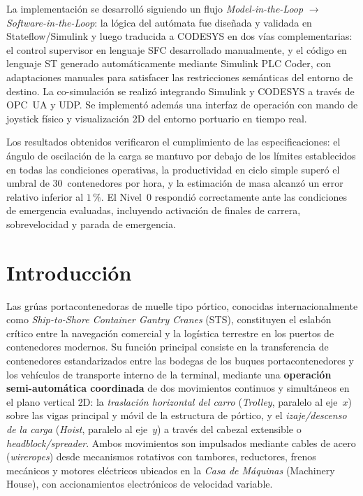 \documentclass[12pt, a4paper]{article}
\begin{document}
La implementación se desarrolló siguiendo un flujo \textit{Model-in-the-Loop}
$\rightarrow$ \textit{Software-in-the-Loop}: la lógica del autómata fue diseñada y
validada en Stateflow/Simulink y luego traducida a CODESYS en dos vías complementarias:
el control supervisor en lenguaje SFC desarrollado manualmente, y el código en lenguaje
ST generado automáticamente mediante Simulink PLC Coder, con adaptaciones manuales para
satisfacer las restricciones semánticas del entorno de destino. La co-simulación se
realizó integrando Simulink y CODESYS a través de OPC~UA y UDP\@. Se implementó además
una interfaz de operación con mando de joystick físico y visualización 2D del entorno
portuario en tiempo real.

Los resultados obtenidos verificaron el cumplimiento de las especificaciones: el
ángulo de oscilación de la carga se mantuvo por debajo de los límites establecidos
en todas las condiciones operativas, la productividad en ciclo simple superó el umbral
de 30~contenedores por hora, y la estimación de masa alcanzó un error relativo
inferior al $1\,\mathrm{\%}$. El Nivel~0 respondió correctamente ante las condiciones de
emergencia evaluadas, incluyendo activación de finales de carrera, sobrevelocidad y
parada de emergencia.

\vfill  %

\newpage
\tableofcontents

\newpage

\section{Introducción}

Las grúas portacontenedoras de muelle tipo pórtico, conocidas internacionalmente como
\textit{Ship-to-Shore Container Gantry Cranes} (STS), constituyen el eslabón crítico entre la
navegación comercial y la logística terrestre en los puertos de contenedores modernos.
Su función principal consiste en la transferencia de contenedores estandarizados entre
las bodegas de los buques portacontenedores y los vehículos de transporte interno de la
terminal, mediante una \textbf{operación semi-automática coordinada} de dos movimientos
continuos y simultáneos en el plano vertical 2D: la \textit{traslación horizontal del
carro} (\textit{Trolley}, paralelo al eje~$x$) sobre las vigas principal y móvil de la
estructura de pórtico, y el \textit{izaje/descenso de la carga} (\textit{Hoist},
paralelo al eje~$y$) a través del cabezal extensible o \textit{headblock/spreader}.
Ambos movimientos son impulsados mediante cables de acero (\textit{wireropes}) desde
mecanismos rotativos con tambores, reductores, frenos mecánicos y motores eléctricos
ubicados en la \textit{Casa de Máquinas} (Machinery House), con accionamientos
electrónicos de velocidad variable.
\end{document}
